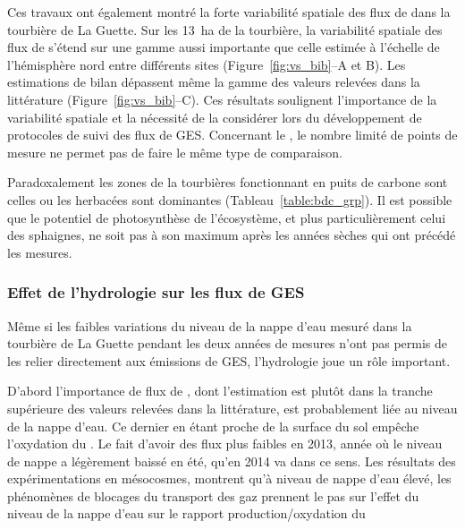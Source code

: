 Ces travaux ont également montré la forte variabilité spatiale des flux de \coo dans la tourbière de La Guette.
Sur les \SI{13}{\hectare} de la tourbière, la variabilité spatiale des flux de \coo s'étend sur une gamme aussi importante que celle estimée à l'échelle de l'hémisphère nord entre différents sites (Figure~\ref{fig:vs_bib}--A et B).
Les estimations de bilan dépassent même la gamme des valeurs relevées dans la littérature (Figure~\ref{fig:vs_bib}--C).
Ces résultats soulignent l'importance de la variabilité spatiale et la nécessité de la considérer lors du développement de protocoles de suivi des flux de GES.
Concernant le \chh, le nombre limité de points de mesure ne permet pas de faire le même type de comparaison.

Paradoxalement les zones de la tourbières fonctionnant en puits de carbone sont celles ou les herbacées sont dominantes (Tableau~\ref{table:bdc_grp}).
Il est possible que le potentiel de photosynthèse de l'écosystème, et plus particulièrement celui des sphaignes, ne soit pas à son maximum après les années sèches qui ont précédé les mesures.

\subsubsection{Effet de l'hydrologie sur les flux de GES}

Même si les faibles variations du niveau de la nappe d'eau mesuré dans la tourbière de La Guette pendant les deux années de mesures n'ont pas permis de les relier directement aux émissions de GES, l'hydrologie joue un rôle important.

D'abord l'importance de flux de \chh, dont l'estimation est plutôt dans la tranche supérieure des valeurs relevées dans la littérature, est probablement liée au niveau de la nappe d'eau.
Ce dernier en étant proche de la surface du sol empêche l'oxydation du \chh.
Le fait d'avoir des flux plus faibles en 2013, année où le niveau de nappe a légèrement baissé en été, qu'en 2014 va dans ce sens.
Les résultats des expérimentations en mésocosmes, montrent qu'à niveau de nappe d'eau élevé, les phénomènes de blocages du transport des gaz prennent le pas sur l'effet du niveau de la nappe d'eau sur le rapport production/oxydation du \chh

